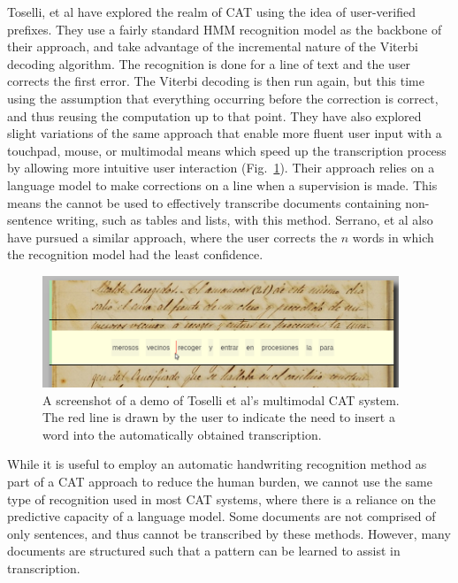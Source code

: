 \documentclass[ms]{byuprop}
\begin{document}
Toselli, et al\cite{Toselli2007} have explored the realm of CAT using the idea of user-verified prefixes. They use a fairly standard HMM recognition model as the backbone of their approach, and take advantage of the incremental nature of the Viterbi decoding algorithm. The recognition is done for a line of text and the user corrects the first error. The Viterbi decoding is then run again, but this time using the assumption that everything occurring before the correction is correct, and thus reusing the computation up to that point. They have also explored slight variations of the same approach that enable more fluent user input with a touchpad\cite{Toselli2008}, mouse\cite{Toselli2009}, or multimodal means\cite{Toselli2010} which speed up the transcription process by allowing more intuitive user interaction (Fig.~\ref{fig:Toselli_multimodalCAT}). Their approach relies on a language model to make corrections on a line when a supervision is made. This means the cannot be used to effectively transcribe documents containing non-sentence writing, such as tables and lists, with this method. Serrano, et al also have pursued a similar approach, where the user corrects the $n$ words in which the recognition model had the least confidence\cite{Serrano2014}.

\begin{figure}[h]
    \centering
    \includegraphics[width=0.95\textwidth]{Toselli_multimodalCAT}
    \caption{A screenshot of a demo of Toselli et al's multimodal CAT system. The red line is drawn by the user to indicate the need to insert a word into the automatically obtained transcription.}
    \label{fig:Toselli_multimodalCAT}
\end{figure}

While it is useful to employ an automatic handwriting recognition method as part of a CAT approach to reduce the human burden, we cannot use the same type of recognition used in most CAT systems, where there is a reliance on the predictive capacity of a language model. Some documents are not comprised of only sentences, and thus cannot be transcribed by these methods. However, many documents are structured such that a pattern can be learned to assist in transcription.
\end{document}
